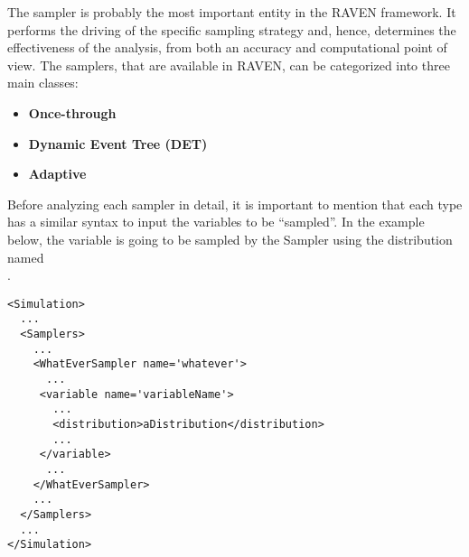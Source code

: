\newcommand{\assemblerROMDescription}
{
  \textbf{Assembler Objects} These objects are either required or optional
    depending on the functionality of the SparseGridCollocation Sampler.
    The objects must be listed with a rigorous syntax that, except for the XML
    node tag, is common among all the objects.
    Each of these nodes must contain 2 attributes that are used to map them
    within the simulation framework:
    \begin{itemize}
      \item \xmlAttr{class}, \xmlDesc{required string attribute}, the main
        ``class'' of the listed object.
        For example, it can be \xmlString{Models}, \xmlString{Functions}, etc.
      \item \xmlAttr{type},  \xmlDesc{required string attribute}, the object
        identifier or sub-type.
        For example, it can be \xmlString{ROM}, \xmlString{External}, etc.
    \end{itemize}
    The \textbf{SparseGridCollocation Sampler} approach requires  the
    following object types:
    \begin{itemize}
      \item \xmlNode{ROM}, \xmlDesc{, string, optional  field}, if used, the
        body of this XML node must contain the name of a ROM defined in the
        \xmlNode{Models} block (see Section~\ref{subsec:models_ROM}).
    \end{itemize}
}

The sampler is probably the most important entity in the RAVEN framework.
%
It performs the driving of the specific sampling strategy and, hence, determines
the effectiveness of the analysis, from both an accuracy and computational point
of view.
%
The samplers, that are available in RAVEN, can be categorized into three main
classes:
\begin{itemize}
\item \textbf{Once-through}
\item \textbf{Dynamic Event Tree (DET)}
\item \textbf{Adaptive}
\end{itemize}
Before analyzing each sampler in detail, it is important to mention that each
type has a similar syntax to input the variables to be ``sampled''.
%
In the example below, the variable  is going to be
sampled by the Sampler  using the distribution named\\
.
\begin{lstlisting}[style=XML]
<Simulation>
  ...
  <Samplers>
    ...
    <WhatEverSampler name='whatever'>
      ...
     <variable name='variableName'>
       ...
       <distribution>aDistribution</distribution>
       ...
     </variable>
      ...
    </WhatEverSampler>
    ...
  </Samplers>
  ...
</Simulation>
\end{lstlisting}

